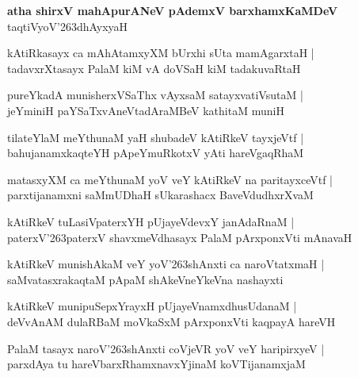 \begin{center}
\textbf{\large atha shirxV mahApurANeV pAdemxV barxhamxKaMDeV}\\
taqtiVyoV\char'263dhAyxyaH
\end{center}

\setcounter{shloka}{0}
\begin{shloka}
kAtiRkasayx ca mAhAtamxyXM bUrxhi sUta mamAgarxtaH |\\
tadavxrXtasayx PalaM kiM vA doVSaH kiM tadakuvaRtaH
\end{shloka}

\begin{shloka}
pureYkadA munisherxVSaThx vAyxsaM satayxvatiVsutaM |\\
jeYminiH paYSaTxvAneVtadAraMBeV kathitaM muniH
\end{shloka}

\begin{shloka}
tilateYlaM meYthunaM yaH shubadeV kAtiRkeV tayxjeVtf |\\
bahujanamxkaqteYH pApeYmuRkotxV yAti hareVgaqRhaM
\end{shloka}

\begin{shloka}
matasxyXM ca meYthunaM yoV veY kAtiRkeV na paritayxceVtf |\\
parxtijanamxni saMmUDhaH sUkarashacx BaveVdudhxrXvaM
\end{shloka}

\begin{shloka}
kAtiRkeV tuLasiVpaterxYH pUjayeVdevxY janAdaRnaM |\\
paterxV\char'263paterxV shavxmeVdhasayx PalaM pArxponxVti mAnavaH
\end{shloka}

\begin{shloka}
kAtiRkeV munishAkaM veY yoV\char'263shAnxti ca naroVtatxmaH |\\
saMvatasxrakaqtaM pApaM shAkeVneYkeVna nashayxti 
\end{shloka}

\begin{shloka}
kAtiRkeV munipuSepxYrayxH pUjayeVnamxdhusUdanaM |\\
deVvAnAM dulaRBaM moVkaSxM pArxponxVti kaqpayA hareVH 
\end{shloka}

\begin{shloka}
PalaM tasayx naroV\char'263shAnxti coVjeVR yoV veY haripirxyeV |\\
parxdAya tu hareVbarxRhamxnavxYjinaM koVTijanamxjaM
\end{shloka}

